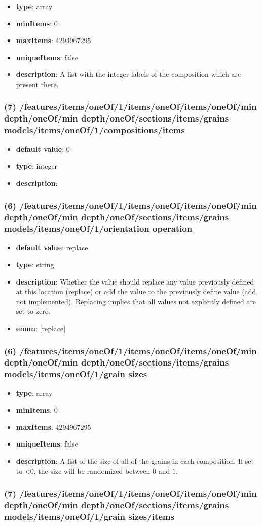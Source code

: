 \begin{itemize}[leftmargin=6em]\item {\bf type}: array
\item {\bf minItems}: 0
\item {\bf maxItems}: 4294967295
\item {\bf uniqueItems}: false
\item {\bf description}: A list with the integer labels of the composition which are present there.
\end{itemize}\subsubsection{(7) /features/items/oneOf/1/items/oneOf/items/oneOf/min depth/oneOf/min depth/oneOf/sections/items/grains models/items/oneOf/1/compositions/items}
\begin{itemize}[leftmargin=7em]\item {\bf default value}: 0
\item {\bf type}: integer
\item {\bf description}: 
\end{itemize}\subsubsection{(6) /features/items/oneOf/1/items/oneOf/items/oneOf/min depth/oneOf/min depth/oneOf/sections/items/grains models/items/oneOf/1/orientation operation}
\begin{itemize}[leftmargin=6em]\item {\bf default value}: replace
\item {\bf type}: string
\item {\bf description}: Whether the value should replace any value previously defined at this location (replace) or add the value to the previously define value (add, not implemented). Replacing implies that all values not explicitly defined are set to zero.
\item {\bf enum}: [replace]\end{itemize}\subsubsection{(6) /features/items/oneOf/1/items/oneOf/items/oneOf/min depth/oneOf/min depth/oneOf/sections/items/grains models/items/oneOf/1/grain sizes}
\begin{itemize}[leftmargin=6em]\item {\bf type}: array
\item {\bf minItems}: 0
\item {\bf maxItems}: 4294967295
\item {\bf uniqueItems}: false
\item {\bf description}: A list of the size of all of the grains in each composition. If set to <0, the size will be randomized between 0 and 1.
\end{itemize}\subsubsection{(7) /features/items/oneOf/1/items/oneOf/items/oneOf/min depth/oneOf/min depth/oneOf/sections/items/grains models/items/oneOf/1/grain sizes/items}

